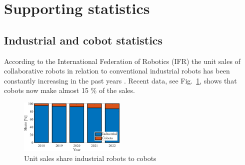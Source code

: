 \newpage
\section{Supporting statistics}
\subsection{Industrial and cobot statistics}\label{sec:robot_statistics}
According to the International Federation of Robotics (IFR) the unit sales of collaborative robots in relation to conventional industrial robots has been constantly increasing in the past years \cite{statista_ir_cobot_share}. Recent data, see Fig.~\ref{fig:industrial_cobot_share}, shows that cobots now make almost 15 \% of the sales.
\begin{figure}[!h]
	\centering
	\includegraphics[width= 0.45\textwidth]{fig/share_industrial_and_cobots.png} 
	\caption{Unit sales share industrial robots to cobots }
	\label{fig:industrial_cobot_share}
\end{figure}

